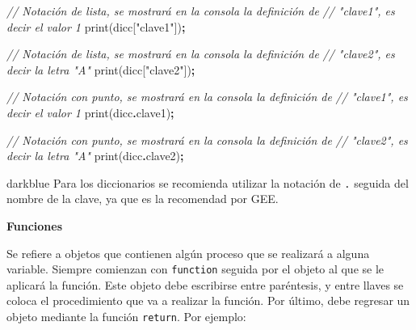 \documentclass[
  12pt,
  letterpaper,
  twoside]{book}
\newenvironment{Shaded}{\begin{snugshade}}{\end{snugshade}}
\newcommand{\AttributeTok}[1]{\textcolor[rgb]{0.77,0.63,0.00}{#1}}
\newcommand{\CommentTok}[1]{\textcolor[rgb]{0.56,0.35,0.01}{\textit{#1}}}
\newcommand{\FunctionTok}[1]{\textcolor[rgb]{0.00,0.00,0.00}{#1}}
\newcommand{\NormalTok}[1]{#1}
\newcommand{\OperatorTok}[1]{\textcolor[rgb]{0.81,0.36,0.00}{\textbf{#1}}}
\newcommand{\StringTok}[1]{\textcolor[rgb]{0.31,0.60,0.02}{#1}}
\begin{document}
\begin{Shaded}
\begin{Highlighting}[]
\CommentTok{// Notación de lista, se mostrará en la consola la definición de }
\CommentTok{// "clave1", es decir el valor 1 }
\FunctionTok{print}\NormalTok{(dicc[}\StringTok{"clave1"}\NormalTok{])}\OperatorTok{;} 

\CommentTok{// Notación de lista, se mostrará en la consola la definición de }
\CommentTok{// "clave2", es decir la letra "A"}
\FunctionTok{print}\NormalTok{(dicc[}\StringTok{"clave2"}\NormalTok{])}\OperatorTok{;}  

\CommentTok{// Notación con punto, se mostrará en la consola la definición de }
\CommentTok{// "clave1", es decir el valor 1 }
\FunctionTok{print}\NormalTok{(dicc}\OperatorTok{.}\AttributeTok{clave1}\NormalTok{)}\OperatorTok{;}  

\CommentTok{// Notación con punto, se mostrará en la consola la definición de }
\CommentTok{// "clave2", es decir la letra "A"}
\FunctionTok{print}\NormalTok{(dicc}\OperatorTok{.}\AttributeTok{clave2}\NormalTok{)}\OperatorTok{;}  
\end{Highlighting}
\end{Shaded}

\begin{bluebox2}

\begin{awesomeblock}{5pt}{\faLightbulb}{darkblue}
Para los diccionarios se recomienda utilizar la notación de \texttt{.} seguida del nombre de la clave, ya que es la recomendad por GEE.

\end{awesomeblock}

\end{bluebox2}

\textbf{Funciones}

Se refiere a objetos que contienen algún proceso que se realizará a alguna variable. Siempre comienzan con \texttt{function} seguida por el objeto al que se le aplicará la función. Este objeto debe escribirse entre paréntesis, y entre llaves se coloca el procedimiento que va a realizar la función. Por último, debe regresar un objeto mediante la función \texttt{return}. Por ejemplo:
\end{document}
